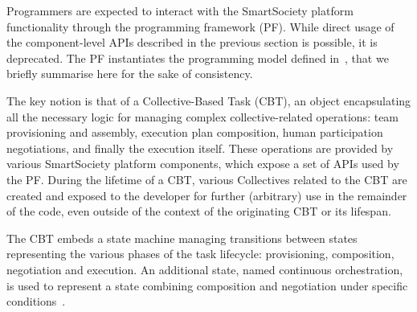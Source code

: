 

Programmers are expected to interact with the SmartSociety platform functionality through the programming framework (PF). While direct usage of the component-level APIs described in the previous section is possible, it is deprecated. The PF instantiates the programming model defined in~\cite{D7.2}, that we briefly summarise here for the sake of consistency. 

The key notion is that of a Collective-Based Task (CBT), an object encapsulating all the necessary logic for managing complex collective-related operations: team provisioning and assembly, execution plan composition, human participation negotiations, and finally the execution itself. These operations are provided by various SmartSociety platform components, which expose a set of APIs used by the PF. During the lifetime of a CBT, various Collectives related to the CBT are created and exposed to the developer for further (arbitrary) use in the remainder of the code, even outside of the context of the originating CBT or its lifespan. 

The CBT embeds a state machine managing transitions between states representing the various phases of the task lifecycle: provisioning, composition, negotiation and execution. An additional state, named continuous orchestration, is used to represent a state combining composition and negotiation under specific conditions~\cite{D7.2}.

